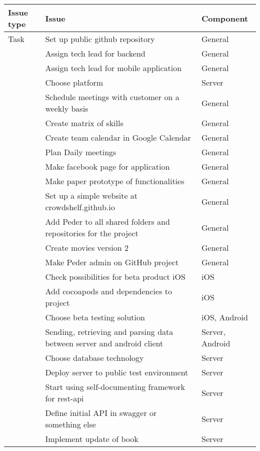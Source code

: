 \begin{table}[]
\centering
\begin{tabular}{|L{2cm}|L{10cm}|L{3cm}|}
\hline
\textbf{Issue type} & \textbf{Issue} & \textbf{Component} \\
\hline
Task & Set up public github repository & General \\
\hline
 & Assign tech lead for backend & General \\
\hline
 & Assign tech lead for mobile application & General \\
\hline
 & Choose platform & Server \\
 \hline
 & Schedule meetings with customer on a weekly basis & General \\
 \hline
 & Create matrix of skills & General \\
 \hline
 & Create team calendar in Google Calendar & General \\
 \hline
 & Plan Daily meetings & General \\
 \hline
 & Make facebook page for application & General\\
 \hline
 & Make paper prototype of functionalities & General \\
 \hline
 & Set up a simple website at crowdshelf.github.io & General \\
 \hline
 & Add Peder to all shared folders and repositories for the project &  General\\
 \hline
 & Create movies version 2 & General \\
 \hline
 & Make Peder admin on GitHub project & General \\
 \hline
 & Check possibilities for beta product iOS & iOS \\
 \hline
 & Add cocoapods and dependencies to project & iOS \\
 \hline
 & Choose beta testing solution & iOS, Android \\
 \hline
 & Sending, retrieving and parsing data between server and android client & Server, Android \\
 \hline
 & Choose database technology & Server \\
\hline
 & Deploy server to public test environment & Server \\
 \hline
 & Start using self-documenting framework for rest-api & Server \\
 \hline
 & Define initial API in swagger or something else & Server \\
 \hline
 & Implement update of book & Server \\
 \hline

\end{tabular}
\end{table}
